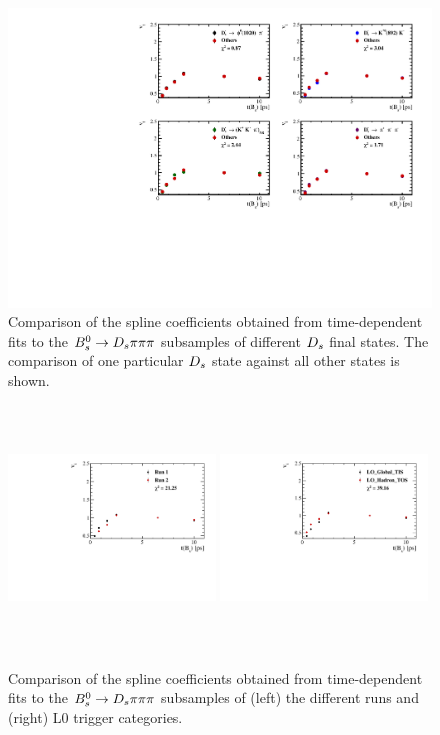 \begin{figure}[h]
\includegraphics[height=!,width=\textwidth]{figs/Acceptance/adaptive_N4/timeAcc_combined_by_DsFinalState.pdf}
\caption{Comparison of the spline coefficients obtained from time-dependent fits to the ${{B}^0_{s}}\rightarrow{\ensuremath{{D}_{s}}}{\ensuremath{\pi}}{\ensuremath{\pi}}{\ensuremath{\pi}}$ subsamples of different ${{D}_{s}}$ final states. 
The comparison of one particular ${{D}_{s}}$ state against all other states is shown.}
\label{fig:AccCompDs}
\end{figure}
\begin{figure}[h]
\includegraphics[height=6.5cm,width=0.49\textwidth]{figs/Acceptance/adaptive_N4/timeAcc_combined_by_run.pdf}
\includegraphics[height=6.5cm,width=0.49\textwidth]{figs/Acceptance/adaptive_N4/timeAcc_combined_by_trigger.pdf}
\caption{Comparison of the spline coefficients obtained from time-dependent fits to the ${{B}^0_{s}}\rightarrow{\ensuremath{{D}_{s}}}{\ensuremath{\pi}}{\ensuremath{\pi}}{\ensuremath{\pi}}$ subsamples of (left) the different runs and (right) L0 trigger categories.}
\label{fig:AccCompRunTrig}
\end{figure}

